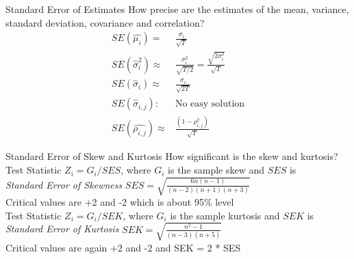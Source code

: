\documentclass[14pt,xcolor=pdftex,dvipsnames,table]{beamer}
\begin{document}

\begin{frame}{Standard Error of Estimates}
How precise are the estimates of the mean, variance, standard deviation, covariance and correlation? 
\begin{align*}
SE(\hat{\mu_i}) = & \frac{\sigma_i}{\sqrt{T}}\\
SE(\hat{\sigma}_i^2) \approx & \frac{\sigma_i^2}{\sqrt{T/2}} = \frac{\sqrt{2\sigma^2_i}}{\sqrt{T}}\\
 SE(\hat{\sigma}_i) \approx & \frac{\sigma_i}{\sqrt{2T}}\\
SE(\hat{\sigma}_{i, j}) : & \text{No easy solution}\\
 SE(\hat{\rho_{i, j}}) \approx & \frac{(1 - \rho^2_{i,j})}{\sqrt{T}}
\end{align*}
\end{frame}



 
\begin{frame}{Standard Error of Skew and Kurtosis}
How significant is the skew and kurtosis? \\
\vspace{5pt}
Test Statistic $Z_i = G_i/SES$,  where $G_i$ is the sample skew and $SES$ is\\
\emph{Standard Error of Skewness} $SES = \sqrt{\frac{6n(n-1)}{(n-2)(n+1)(n+3)}}$\\
\vspace{5pt}
Critical values are +2 and -2 which is about 95\% level\\
\vspace{5pt}
Test Statistic $Z_i = G_i/SEK$, where $G_i$ is the sample kurtosis and $SEK$ is\\
\emph{Standard Error of Kurtosis} $SEK = \sqrt{\frac{n^2 -1}{(n-3)(n+5)}}$\\
\vspace{5pt}
Critical values are again +2 and -2 and SEK = 2 * SES
\end{frame} 
\end{document}
